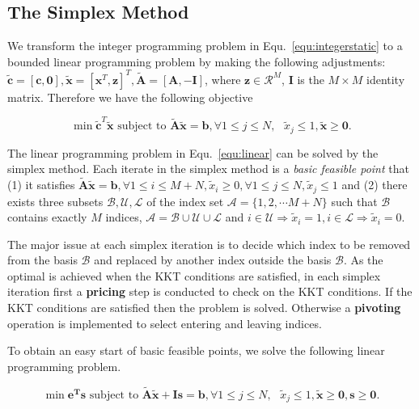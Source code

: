 \documentclass[runningheads]{llncs}
\begin{document}
\subsection{The Simplex Method}
We transform the integer programming problem in Equ.~\ref{equ:integerstatic} to a bounded linear programming problem by making the following adjustments: $\tilde{\mathbf{c}}=[\mathbf{c},\mathbf{0}],\tilde{\mathbf{x}}=[\mathbf{x}^T,\mathbf{z}]^T,\tilde{\mathbf{A}}=[\mathbf{A},-\mathbf{I}]$, where $\mathbf{z}\in\mathcal{R}^M$, $ \mathbf{I}$ is the $M\times M$ identity matrix. Therefore we have the following objective

\vspace{-0.3cm}
\begin{equation}\label{equ:linear}
\min \tilde{\mathbf{c}}^T \tilde{\mathbf{x}}\textrm{ subject to } \tilde{\mathbf{A}}\tilde{\mathbf{x}} = \mathbf{b}, \forall 1\leq j\leq N,\textrm{ } \tilde{x}_j \leq 1, \tilde{\mathbf{x}}\geq \mathbf{0}.
\end{equation}
\vspace{-0.6cm}

The linear programming problem in Equ.~\ref{equ:linear} can be solved by the simplex method. Each iterate in the simplex method is a \emph{basic feasible point} that (1) it satisfies $\tilde{\mathbf{A}}\tilde{\mathbf{x}} = \mathbf{b}, \forall 1\leq i\leq M+N,\tilde{x}_i \geq 0,\forall 1\leq j\leq N, \tilde{x}_j \leq 1$ and (2) there exists three subsets $\mathcal{B,U,L}$ of the index set $\mathcal{A}=\{1,2,\cdots M+N\}$ such that $\mathcal{B}$ contains exactly $M$ indices, $\mathcal{A}=\mathcal{B}\cup \mathcal{U} \cup \mathcal{L}$ and $i \in \mathcal{U} \Rightarrow \tilde{x}_i=1,i \in \mathcal{L} \Rightarrow \tilde{x}_i=0$.

The major issue at each simplex iteration is to decide which index to be removed from the basis $\mathcal{B}$ and replaced by another index outside the basis $\mathcal{B}$.  As the optimal is achieved when the KKT conditions are satisfied, in each simplex iteration first  a \textbf{pricing} step is conducted to check on the KKT conditions.  If the KKT conditions are satisfied then the problem is solved. Otherwise a \textbf{pivoting} operation is implemented to select entering and leaving indices.

To obtain an easy start of basic feasible points, we solve the following linear programming problem.

\vspace{-0.6cm}
\begin{equation}\label{equ:linearphaseI}
\min \mathbf{e^{T}s} \textrm{ subject to } \tilde{\mathbf{A}}\tilde{\mathbf{x}} + \mathbf{Is} = \mathbf{b},  \forall 1\leq j\leq N,\textrm{ } \tilde{x}_j \leq 1, \tilde{\mathbf{x}}\geq \mathbf{0}, \mathbf{s}\geq \mathbf{0}.
\end{equation}
\vspace{-0.6cm}
\end{document}
